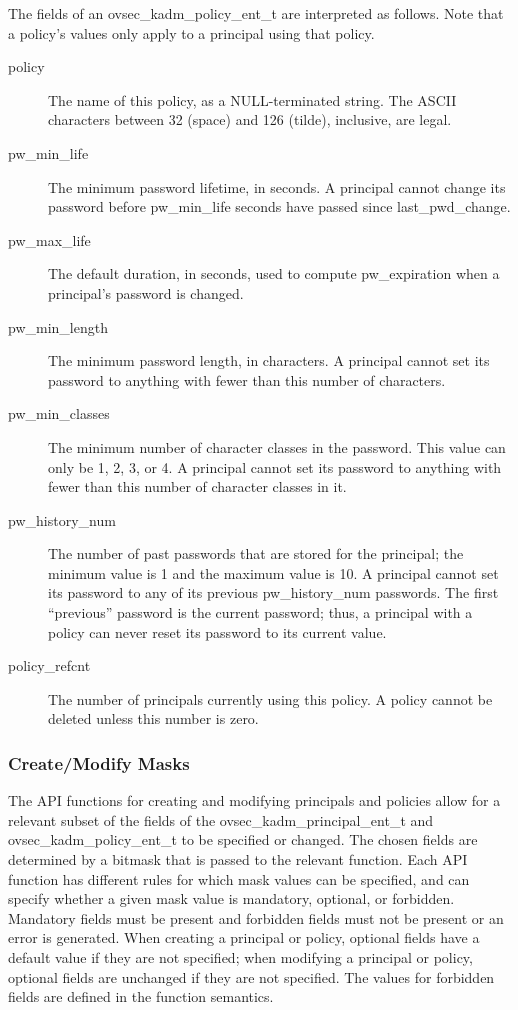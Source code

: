 The fields of an ovsec_kadm_policy_ent_t are interpreted as follows.
Note that a policy's values only apply to a principal using that
policy.

\begin{description}
\item[policy] The name of this policy, as a NULL-terminated string.
The ASCII characters between 32 (space) and 126 (tilde), inclusive,
are legal.

\item[pw_min_life] The minimum password lifetime, in seconds.
A principal cannot change its password before pw_min_life seconds have
passed since last_pwd_change.

\item[pw_max_life] The default duration, in seconds, used to compute
pw_expiration when a principal's password is changed.

\item[pw_min_length] The minimum password length, in characters.  A
principal cannot set its password to anything with fewer than this
number of characters.

\item[pw_min_classes] The minimum number of character classes in the
password.  This value can only be 1, 2, 3, or 4.  A principal cannot
set its password to anything with fewer than this number of character
classes in it.

\item[pw_history_num] The number of past passwords that are
stored for the principal; the minimum value is 1 and the maximum value
is 10.  A principal cannot set its password to any of its previous
pw_history_num passwords.  The first ``previous'' password is the
current password; thus, a principal with a policy can never reset its
password to its current value.

\item[policy_refcnt]  The number of principals currently using this policy.
A policy cannot be deleted unless this number is zero.
\end{description}

\subsubsection{Create/Modify Masks}
\label{sec:masks}

The API functions for creating and modifying principals and policies
allow for a relevant subset of the fields of the
ovsec_kadm_principal_ent_t and ovsec_kadm_policy_ent_t to be specified
or changed.  The chosen fields are determined by a bitmask that is
passed to the relevant function.  Each API function has different
rules for which mask values can be specified, and can specify whether
a given mask value is mandatory, optional, or forbidden.  Mandatory
fields must be present and forbidden fields must not be present or an
error is generated.  When creating a principal or policy, optional
fields have a default value if they are not specified; when modifying
a principal or policy, optional fields are unchanged if they are not
specified.  The values for forbidden fields are defined in the
function semantics.

